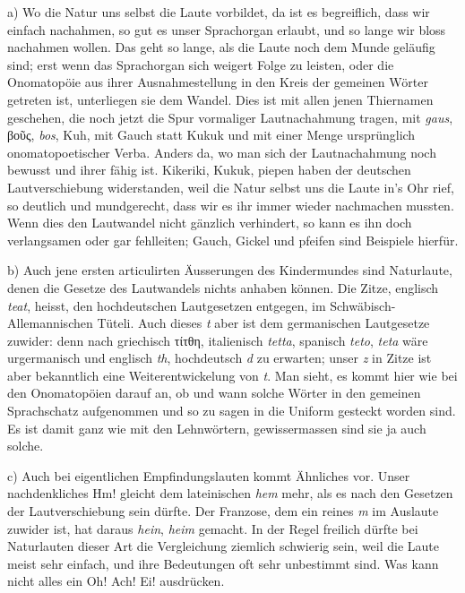 {a) Wo die Natur uns selbst die Laute vorbildet, da ist es begreiflich, dass wir einfach nachahmen, so gut es unser Sprachorgan erlaubt, und so lange wir bloss nachahmen wollen. Das geht so lange, als die Laute noch dem Munde geläufig sind; erst wenn das Sprachorgan sich weigert Folge zu leisten, oder die Onomatopöie aus ihrer Ausnahmestellung in den Kreis der gemeinen Wörter getreten ist, unterliegen sie dem Wandel. Dies ist mit allen jenen Thiernamen geschehen, die noch jetzt die Spur vormaliger Lautnachahmung tragen, mit \textit{gaus}, βοῦς, \textit{bos}, Kuh, mit Gauch statt Kukuk und mit einer Menge ursprünglich onomatopoetischer Verba. Anders da, wo man sich der Lautnachahmung noch bewusst und ihrer fähig ist. Kikeriki, Kukuk, piepen haben der deutschen Lautverschiebung widerstanden, weil die Natur selbst uns die Laute in’s Ohr rief, so deutlich und mundgerecht, dass wir es ihr immer wieder nachmachen mussten. Wenn dies den Lautwandel nicht gänzlich verhindert, so kann es ihn doch verlangsamen oder gar fehlleiten; Gauch, Gickel und pfeifen sind Beispiele hierfür.

b) Auch jene ersten articulirten Äusserungen des Kindermundes sind Naturlaute, denen die Gesetze des Lautwandels nichts anhaben können. Die Zitze, englisch \textit{teat}, heisst, den hochdeutschen Lautgesetzen entgegen, im Schwäbisch-Allemannischen Tüteli. Auch dieses \textit{t} aber ist dem germanischen Lautgesetze zuwider: denn nach griechisch τίτθη, italienisch \textit{tetta}, spanisch \textit{teto}, \textit{teta} wäre urgermanisch und englisch \textit{th}, hochdeutsch \textit{d} zu erwarten; unser \textit{z} in Zitze ist aber bekanntlich eine Weiterentwickelung von \textit{t}.  Man sieht, es kommt hier wie bei den Onomatopöien darauf an, ob und wann solche Wörter in den gemeinen Sprachschatz aufgenommen und so zu sagen in die Uniform gesteckt worden sind. Es ist damit ganz wie mit den Lehnwörtern,  gewissermassen sind sie ja auch solche.

c) Auch bei eigentlichen Empfindungslauten kommt Ähnliches vor. Unser nachdenkliches Hm! gleicht dem lateinischen \textit{hem} mehr, als es \label{fp.210} nach den Gesetzen der Lautverschiebung sein dürfte. Der Franzose, dem ein reines \textit{m} im \label{sp.209} Auslaute zuwider ist, hat daraus \textit{hein}, \textit{heim} gemacht. In der Regel freilich dürfte bei Naturlauten dieser Art die Vergleichung ziemlich schwierig sein, weil die Laute meist sehr einfach, und ihre Bedeutungen oft sehr unbestimmt sind. Was kann nicht alles ein Oh! Ach! Ei! ausdrücken.

}
